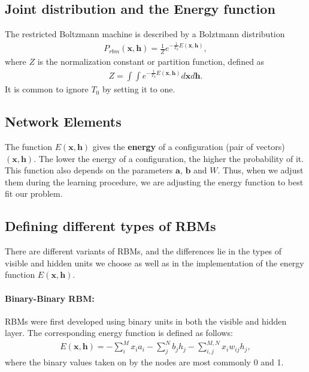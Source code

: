 \documentclass[%
oneside,                 %
final,                   %
10pt]{article}
\begin{document}
\noindent
\subsection{Joint distribution and the Energy function}
The restricted Boltzmann machine is described by a Bolztmann distribution
\begin{align}
	P_{rbm}(\mathbf{x},\mathbf{h}) = \frac{1}{Z} e^{-\frac{1}{T_0}E(\mathbf{x},\mathbf{h})},
\end{align}
where $Z$ is the normalization constant or partition function, defined as 
\begin{align}
	Z = \int \int e^{-\frac{1}{T_0}E(\mathbf{x},\mathbf{h})} d\mathbf{x} d\mathbf{h}.
\end{align}
It is common to ignore $T_0$ by setting it to one. 

\subsection{Network Elements}

The function $E(\mathbf{x},\mathbf{h})$ gives the \textbf{energy} of a
configuration (pair of vectors) $(\mathbf{x}, \mathbf{h})$. The lower
the energy of a configuration, the higher the probability of it. This
function also depends on the parameters $\mathbf{a}$, $\mathbf{b}$ and
$W$. Thus, when we adjust them during the learning procedure, we are
adjusting the energy function to best fit our problem.

\subsection{Defining different types of RBMs}
There are different variants of RBMs, and the differences lie in the types of visible and hidden units we choose as well as in the implementation of the energy function $E(\mathbf{x},\mathbf{h})$. 


\paragraph{Binary-Binary RBM:}

RBMs were first developed using binary units in both the visible and hidden layer. The corresponding energy function is defined as follows:
\begin{align}
	E(\mathbf{x}, \mathbf{h}) = - \sum_i^M x_i a_i- \sum_j^N b_j h_j - \sum_{i,j}^{M,N} x_i w_{ij} h_j,
\end{align}
where the binary values taken on by the nodes are most commonly 0 and 1.
\end{document}
